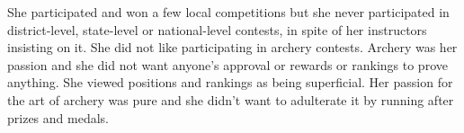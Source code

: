 She participated and won a few local competitions but she never participated in
district-level, state-level or national-level contests, in spite of her
instructors insisting on it. She did not like participating in archery contests.
Archery was her passion and she did not want anyone's approval or rewards or
rankings to prove anything. She viewed positions and rankings as being
superficial. Her passion for the art of archery was pure and she didn't want to
adulterate it by running after prizes and medals.